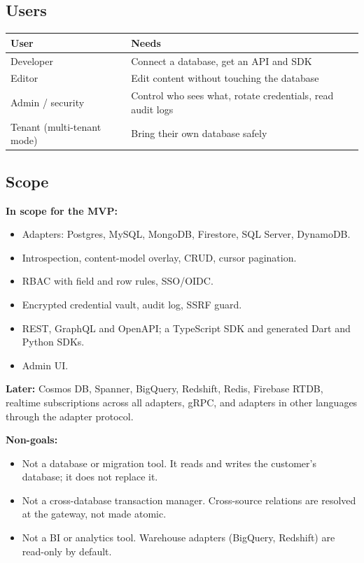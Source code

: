 \documentclass[11pt,a4paper]{article}
\begin{document}
\subsection{Users}
\begin{tabularx}{\linewidth}{@{}lX@{}}
\toprule
\textbf{User} & \textbf{Needs}\\
\midrule
Developer & Connect a database, get an API and SDK\\
Editor & Edit content without touching the database\\
Admin / security & Control who sees what, rotate credentials, read audit logs\\
Tenant (multi-tenant mode) & Bring their own database safely\\
\bottomrule
\end{tabularx}\smallskip

\subsection{Scope}
\textbf{In scope for the MVP:}
\begin{itemize}
  \item Adapters: Postgres, MySQL, MongoDB, Firestore, SQL Server, DynamoDB.
  \item Introspection, content-model overlay, CRUD, cursor pagination.
  \item RBAC with field and row rules, SSO/OIDC.
  \item Encrypted credential vault, audit log, SSRF guard.
  \item REST, GraphQL and OpenAPI; a TypeScript SDK and generated Dart and Python SDKs.
  \item Admin UI.
\end{itemize}
\textbf{Later:} Cosmos DB, Spanner, BigQuery, Redshift, Redis, Firebase RTDB, realtime subscriptions across all adapters, gRPC, and adapters in other languages through the adapter protocol.

\textbf{Non-goals:}
\begin{itemize}
  \item Not a database or migration tool. It reads and writes the customer's database; it does not replace it.
  \item Not a cross-database transaction manager. Cross-source relations are resolved at the gateway, not made atomic.
  \item Not a BI or analytics tool. Warehouse adapters (BigQuery, Redshift) are read-only by default.
\end{itemize}
\end{document}
